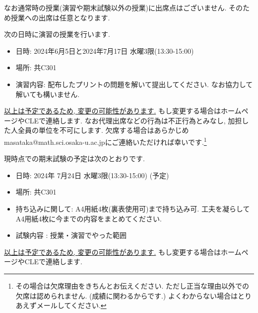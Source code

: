 \documentclass[dvipdfmx,a4paper,11pt]{article}
\theoremstyle{definition}
\begin{document}
なお通常時の授業(演習や期末試験以外の授業)に出席点はございません. そのため授業への出席は任意となります. 


\medskip
{}

次の日時に演習の授業を行います. 
\begin{itemize}
  \setlength{\parskip}{0cm} 
  \setlength{\itemsep}{0cm}
\item 日時: 2024年6月5日と2024年7月17日 水曜3限(13:30-15:00)
\item 場所: 共C301
\item 演習内容: 配布したプリントの問題を解いて提出してください. なお協力して解いても構いません. 
\end{itemize}
\underline{以上は予定であるため, 変更の可能性があります.} もし変更する場合はホームページやCLEで連絡します. 
なお代理出席などの行為は不正行為とみなし, 加担した人全員の単位を不可にします.
欠席する場合はあらかじめmasataka@math.sci.osaka-u.ac.jpにご連絡いただければ幸いです.\footnote{その場合は欠席理由をきちんとお伝えください. ただし正当な理由以外での欠席は認められません. (成績に関わるからです.) よくわからない場合はとりあえずメールしてください.}

\newpage
{}

現時点での期末試験の予定は次のとおりです. 
\begin{itemize}
  \setlength{\parskip}{0cm} 
  \setlength{\itemsep}{0cm}
\item 日時: 2024年 7月24日 水曜3限(13:30-15:00) (予定)
\item 場所: 共C301
\item 持ち込みに関して: A4用紙4枚(裏表使用可)まで持ち込み可. 工夫を凝らしてA4用紙4枚に今までの内容をまとめてください.
\item 試験内容 : 授業・演習でやった範囲
\end{itemize}
\underline{以上は予定であるため, 変更の可能性があります.} もし変更する場合はホームページやCLEで連絡します. 
\end{document}
